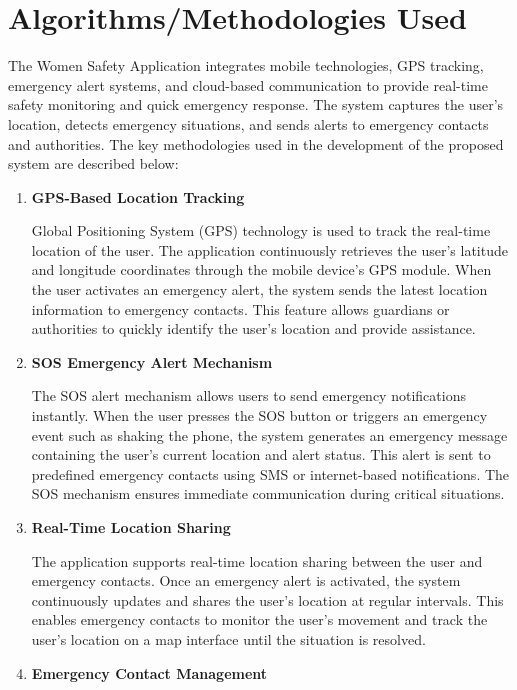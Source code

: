 \documentclass[a4paper,12pt]{report}
\begin{document}
\section{Algorithms/Methodologies Used}

The Women Safety Application integrates mobile technologies, GPS tracking, emergency alert systems, and cloud-based communication to provide real-time safety monitoring and quick emergency response. The system captures the user’s location, detects emergency situations, and sends alerts to emergency contacts and authorities. The key methodologies used in the development of the proposed system are described below:\\

\begin{enumerate}

\item \textbf{GPS-Based Location Tracking}

Global Positioning System (GPS) technology is used to track the real-time location of the user. The application continuously retrieves the user’s latitude and longitude coordinates through the mobile device’s GPS module. When the user activates an emergency alert, the system sends the latest location information to emergency contacts. This feature allows guardians or authorities to quickly identify the user’s location and provide assistance.


\item \textbf{SOS Emergency Alert Mechanism}

The SOS alert mechanism allows users to send emergency notifications instantly. When the user presses the SOS button or triggers an emergency event such as shaking the phone, the system generates an emergency message containing the user’s current location and alert status. This alert is sent to predefined emergency contacts using SMS or internet-based notifications. The SOS mechanism ensures immediate communication during critical situations.


\item \textbf{Real-Time Location Sharing}

The application supports real-time location sharing between the user and emergency contacts. Once an emergency alert is activated, the system continuously updates and shares the user’s location at regular intervals. This enables emergency contacts to monitor the user’s movement and track the user’s location on a map interface until the situation is resolved.


\item \textbf{Emergency Contact Management}


\end{enumerate}
\end{document}
